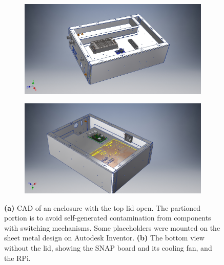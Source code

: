 \begin{figure}
	\centering
	\begin{subfigure}[t]{0.52\textwidth}
		\centering
		\includegraphics[width=\linewidth]{"Figures/Top Open"} 
		\caption{} \label{Fig:Top Open}
	\end{subfigure}
	\hfill
	\begin{subfigure}[t]{0.46\textwidth}
		\centering
		\includegraphics[width=\linewidth]{"Figures/Bottom Open"}
		\caption{} \label{Fig:Bottom Open}
	\end{subfigure}
	\caption{{\bf (a)} CAD of an enclosure with the top lid open. The partioned portion is to avoid self-generated contamination from components with switching mechanisms. Some placeholders were mounted on the sheet metal design on Autodesk Inventor. {\bf (b)} The bottom view without the lid, showing the SNAP board and its cooling fan, and the RPi. } \label{Fig:farap}
\end{figure}


